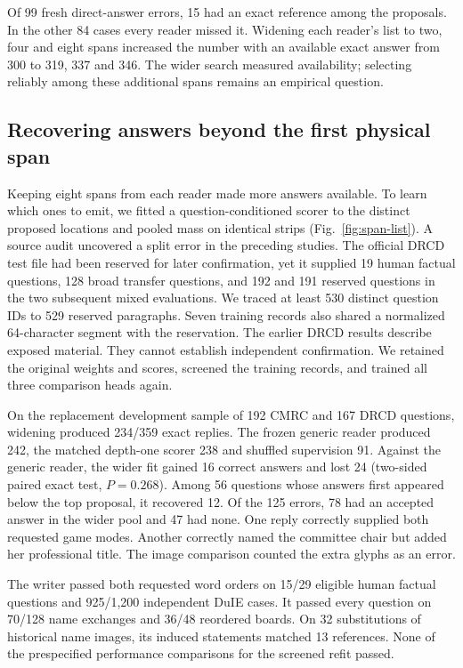 \documentclass[12pt,a4paper]{article}
\providecommand{\DIFadd}[1]{{\protect\color{blue} \sf #1}} %
\begin{document}
\DIFadd{Of 99 fresh direct-answer errors, 15 had an exact reference among the proposals. In the other 84 cases every reader missed it. Widening each reader's list to two, four and eight spans increased the number with an available exact answer from 300 to 319, 337 and 346. The wider search measured availability; selecting reliably among these additional spans remains an empirical question.
}


\subsection*{\DIFadd{Recovering answers beyond the first physical span}}
\DIFadd{Keeping eight spans from each reader made more answers available. To learn which ones to emit, we fitted a question-conditioned scorer to the distinct proposed locations and pooled mass on identical strips (Fig.~\ref{fig:span-list}). A source audit uncovered a split error in the preceding studies. The official DRCD test file had been reserved for later confirmation, yet it supplied 19 human factual questions, 128 broad transfer questions, and 192 and 191 reserved questions in the two subsequent mixed evaluations. We traced at least 530 distinct question IDs to 529 reserved paragraphs. Seven training records also shared a normalized 64-character segment with the reservation. The earlier DRCD results describe exposed material. They cannot establish independent confirmation. We retained the original weights and scores, screened the training records, and trained all three comparison heads again.
}

\DIFadd{On the replacement development sample of 192 CMRC and 167 DRCD questions, widening produced 234/359 exact replies. The frozen generic reader produced 242, the matched depth-one scorer 238 and shuffled supervision 91. Against the generic reader, the wider fit gained 16 correct answers and lost 24 (two-sided paired exact test, $P=0.268$). Among 56 questions whose answers first appeared below the top proposal, it recovered 12. Of the 125 errors, 78 had an accepted answer in the wider pool and 47 had none. One reply correctly supplied both requested game modes. Another correctly named the committee chair but added her professional title. The image comparison counted the extra glyphs as an error.
}

\DIFadd{The writer passed both requested word orders on 15/29 eligible human factual questions and 925/1,200 independent DuIE cases. It passed every question on 70/128 name exchanges and 36/48 reordered boards. On 32 substitutions of historical name images, its induced statements matched 13 references. None of the prespecified performance comparisons for the screened refit passed.
}
\end{document}

